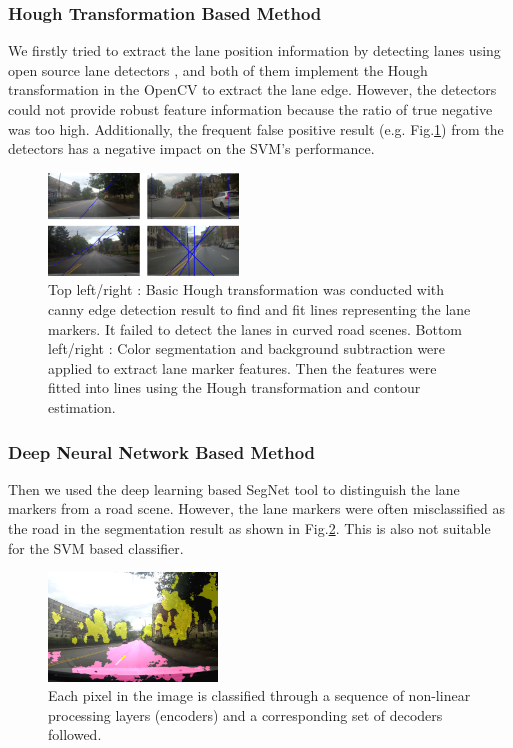 \documentclass[10pt,twocolumn,letterpaper]{article}
\begin{document}
\subsubsection{Hough Transformation Based Method}
We firstly tried to extract the lane position information by detecting lanes using open source lane detectors \cite{lanedetection,carcv}, and both of them implement the Hough transformation in the OpenCV to extract the lane edge. However, the detectors could not provide robust feature information because the ratio of true negative was too high. Additionally, the frequent false positive result (e.g. Fig.\ref{fig:lanedetection}) from the detectors has a negative impact on the SVM's performance.

\begin{figure}[t]
	\centering
	\includegraphics[width=0.45\textwidth]{./img/lanedetection.png}
	\caption{Top left/right \cite{lanedetection}:  Basic Hough transformation was conducted with canny edge detection result to find and fit lines representing the lane markers. It failed to detect the lanes in curved road scenes. Bottom left/right \cite{carcv}: Color segmentation and background subtraction were applied to extract lane marker features. Then the features were fitted into lines using the Hough transformation and contour estimation.}
	\label{fig:lanedetection}
\end{figure}

\subsubsection{Deep Neural Network Based Method}
Then we used the deep learning based SegNet tool \cite{segnet, badrinarayanan2015segnet2} to distinguish the lane markers from a road scene. However, the lane markers were often misclassified as the road in the segmentation result as shown in Fig.\ref{fig:segnet}. This is also not suitable for the SVM based classifier.

\begin{figure}[t]
	\centering
	\includegraphics[width=0.4\textwidth]{./img/segnet.png}
	\caption{Each pixel in the image is classified through a sequence of non-linear processing layers (encoders) and a corresponding set of decoders followed.}
	\label{fig:segnet}
\end{figure}
\end{document}
